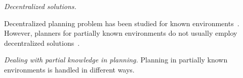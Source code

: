 \emph{Decentralized solutions.}


Decentralized planning problem has been studied for known environments~\cite{schillinger2016decomposition,guo2015multi,tumova2016multi}.
However, planners for partially known environments do not usually employ decentralized solutions~\cite{roy2006planning,du2012robot,diaz2001exploring}. 

\emph{Dealing with partial knowledge in planning.}
Planning in partially known environments is handled in different ways. 
